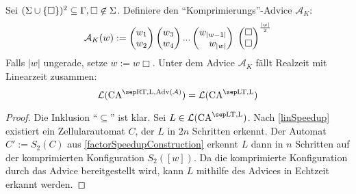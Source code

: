 \begin{satz}
    Sei $(\Sigma \cup \{ {\Box} \}) ^2 \subseteq \Gamma, \Box \not\in \Sigma$.
    Definiere den \enquote{Komprimierungs}-Advice $\mathcal{A}_K$:
    \[
        \mathcal{A}_K(w) := 
                  \Spvek{w_1; w_2} \Spvek{w_3; w_4} ... \Spvek{w_{|w-1|}; w_{|w|}}
                        \; \Spvek{\Box; \Box}^\frac{|w|}{2}
    \]
    Falls $|w|$ ungerade, setze $w := w\Box$.
    Unter dem Advice $\mathcal{A}_K$ fällt Realzeit mit Linearzeit zusammen:
    \[
        \CAL{\CART, \CALeft, \orakel({\mathcal{A}})} = \CAL{\CALT, \CALeft}
    \]
\end{satz}
\begin{proof}
    Die Inklusion \enquote{$\subseteq$} ist klar.
    Sei $L \in \CAL{\CALT, \CALeft}$.
    Nach \cref{linSpeedup} existiert ein Zellularautomat $C$, der $L$ in $2n$ Schritten erkennt.
    Der Automat $C' := S_2(C)$ aus \cref{factorSpeedupConstruction}
    erkennt $L$ dann in $n$ Schritten auf der komprimierten Konfiguration $S_2([w])$.
    Da die komprimierte Konfiguration durch das Advice bereitgestellt wird, kann $L$ mithilfe des Advices in Echtzeit erkannt werden.
\end{proof}


\begin{comment}
    \begin{satz}
        Sei $(\Sigma \cup \finset{\Box}) ^2 \subseteq \Gamma, \Box \not\in \Sigma$.
        
        \begin{enumerate}
            \item  $\mathcal{A}_1(w) := \Gamma^{|w|}$
        \end{enumerate}
        
        Es gilt jeweils:
        \[
            \CAL{\CART, \orakel({\mathcal{A}_i})} = \CAL{\CALT, \orakel({\mathcal{A}_i})}
        \]
        
    \end{satz}

    \begin{definition}
        Seien $\mathcal{A}_1$ und $\mathcal{A}_2$ zwei Orakel, $M \subseteq \ECA$ (falls nicht angegeben, $M := \ECA^\CART$).
        \[
            \mathcal{A}_1 \leq_M \mathcal{A}_2 \; :\Leftrightarrow \; \mathcal{L}(M^{\orakel(\mathcal{A}_1)}) \subseteq \mathcal{L}(M^{\orakel(\mathcal{A}_2)})
        \]        
    \end{definition}
    
    \begin{lemma}
        Es gibt kein maximales Orakel.
    \end{lemma}
    
\end{comment}

